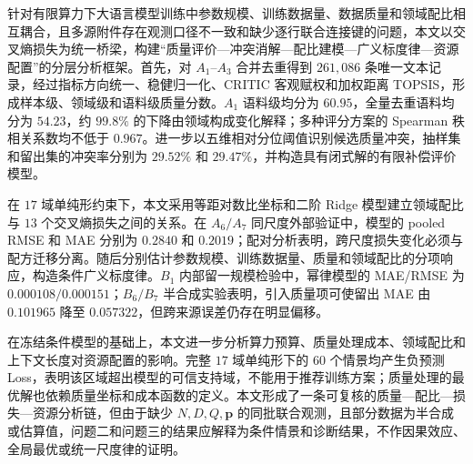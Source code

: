 针对有限算力下大语言模型训练中参数规模、训练数据量、数据质量和领域配比相互耦合，且多源附件存在观测口径不一致和缺少逐行联合连接键的问题，本文以交叉熵损失为统一桥梁，构建“质量评价—冲突消解—配比建模—广义标度律—资源配置”的分层分析框架。首先，对 $A_1$--$A_3$ 合并去重得到 $261{,}086$ 条唯一文本记录，经过指标方向统一、稳健归一化、CRITIC 客观赋权和加权距离 TOPSIS，形成样本级、领域级和语料级质量分数。$A_1$ 语料级均分为 $60.95$，全量去重语料均分为 $54.23$，约 $99.8\%$ 的下降由领域构成变化解释；多种评分方案的 Spearman 秩相关系数均不低于 $0.967$。进一步以五维相对分位阈值识别候选质量冲突，抽样集和留出集的冲突率分别为 $29.52\%$ 和 $29.47\%$，并构造具有闭式解的有限补偿评价模型。

在 $17$ 域单纯形约束下，本文采用等距对数比坐标和二阶 Ridge 模型建立领域配比与 $13$ 个交叉熵损失之间的关系。在 $A_6/A_7$ 同尺度外部验证中，模型的 pooled RMSE 和 MAE 分别为 $0.2840$ 和 $0.2019$；配对分析表明，跨尺度损失变化必须与配方迁移分离。随后分别估计参数规模、训练数据量、质量和领域配比的分项响应，构造条件广义标度律。$B_1$ 内部留一规模检验中，幂律模型的 MAE/RMSE 为 $0.000108/0.000151$；$B_6/B_7$ 半合成实验表明，引入质量项可使留出 MAE 由 $0.101965$ 降至 $0.057322$，但跨来源误差仍存在明显偏移。

在冻结条件模型的基础上，本文进一步分析算力预算、质量处理成本、领域配比和上下文长度对资源配置的影响。完整 $17$ 域单纯形下的 $60$ 个情景均产生负预测 Loss，表明该区域超出模型的可信支持域，不能用于推荐训练方案；质量处理的最优解也依赖质量坐标和成本函数的定义。本文形成了一条可复核的质量—配比—损失—资源分析链，但由于缺少 $N,D,Q,\boldsymbol p$ 的同批联合观测，且部分数据为半合成或估算值，问题二和问题三的结果应解释为条件情景和诊断结果，不作因果效应、全局最优或统一尺度律的证明。
\\
